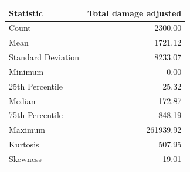 \begin{table}[htbp]
\centering
{}
\label{tab:damages_sum}
\small
\begin{tabular}{lr}
\toprule
\textbf{Statistic} & \textbf{Total damage adjusted} \\
\midrule
Count & 2300.00 \\
Mean & 1721.12 \\
Standard Deviation & 8233.07 \\
Minimum & 0.00 \\
25th Percentile & 25.32 \\
Median & 172.87 \\
75th Percentile & 848.19 \\
Maximum & 261939.92 \\
Kurtosis & 507.95 \\
Skewness & 19.01 \\
\bottomrule
\end{tabular}
\end{table}
